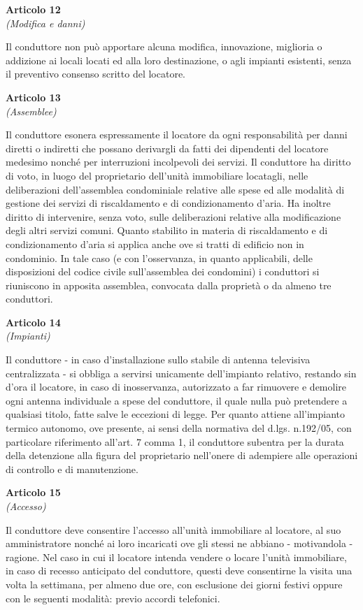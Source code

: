 \documentclass{contratto}
\begin{document}
\begin{center}
\textbf{\Large Articolo 12}\\
\textit{(Modifica e danni)}
\end{center}
Il conduttore non può apportare alcuna modifica, innovazione, miglioria o addizione ai locali locati ed alla loro destinazione, o agli impianti esistenti, senza il preventivo consenso scritto del locatore. 

\begin{center}
\textbf{\Large Articolo 13}\\
\textit{(Assemblee)}
\end{center}
Il conduttore esonera espressamente il locatore da ogni
responsabilità per danni diretti o indiretti che possano derivargli da fatti dei dipendenti del
locatore medesimo nonché per interruzioni incolpevoli dei servizi. Il conduttore ha diritto di
voto, in luogo del proprietario dell'unità immobiliare locatagli, nelle deliberazioni
dell'assemblea condominiale relative alle spese ed alle modalità di gestione dei servizi di
riscaldamento e di condizionamento d'aria. Ha inoltre diritto di intervenire, senza voto, sulle
deliberazioni relative alla modificazione degli altri servizi comuni. Quanto stabilito in materia
di riscaldamento e di condizionamento d'aria si applica anche ove si tratti di edificio non in
condominio. In tale caso (e con l'osservanza, in quanto applicabili, delle disposizioni del
codice civile sull'assemblea dei condomini) i conduttori si riuniscono in apposita assemblea,
convocata dalla proprietà o da almeno tre conduttori. 

\newpage
\begin{center}
\textbf{\Large Articolo 14}\\
\textit{(Impianti)}
\end{center}
 Il conduttore - in caso d'installazione sullo stabile di antenna
televisiva centralizzata - si obbliga a servirsi unicamente dell'impianto relativo, restando sin
d'ora il locatore, in caso di inosservanza, autorizzato a far rimuovere e demolire ogni antenna
individuale a spese del conduttore, il quale nulla può pretendere a qualsiasi titolo, fatte salve
le eccezioni di legge. Per quanto attiene all'impianto termico autonomo, ove presente, ai sensi
della normativa del d.lgs. n.192/05, con particolare riferimento all’art. 7 comma 1, il
conduttore subentra per la durata della detenzione alla figura del proprietario nell’onere di
adempiere alle operazioni di controllo e di manutenzione.

\begin{center}
\textbf{\Large Articolo 15}\\
\textit{(Accesso)}
\end{center}
 Il conduttore deve consentire l'accesso all'unità immobiliare al
locatore, al suo amministratore nonché ai loro incaricati ove gli stessi ne abbiano -
motivandola - ragione. Nel caso in cui il locatore intenda vendere o locare l'unità immobiliare,
in caso di recesso anticipato del conduttore, questi deve consentirne la visita una volta la
settimana, per almeno due ore, con esclusione dei giorni festivi oppure con le seguenti modalità: previo accordi telefonici.
\end{document}

